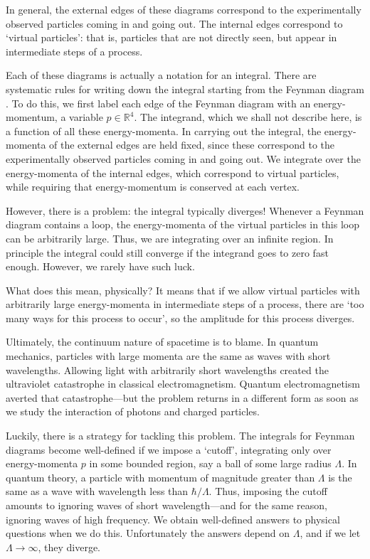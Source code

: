 \documentclass{article}
\newcommand{\R}{\mathbb{R}}
\begin{document}
In general, the external edges of these diagrams correspond to the experimentally observed particles coming in and going out.  The internal edges correspond to `virtual particles': that is, particles that are not directly seen, but appear in intermediate steps of a process.

Each of these diagrams is actually a notation for an integral. There are systematic rules for writing down the integral starting from the Feynman diagram \cite{IZ,PS}.  To do this, we first label each edge of the Feynman diagram with an energy-momentum, a variable $p \in \R^4$.   The integrand, which we shall not describe here, is a function of all these energy-momenta.  In carrying out the integral, the energy-momenta of the external edges are held fixed, since these correspond to the experimentally observed particles coming in and going out.  We integrate over the energy-momenta of the internal edges, which correspond to virtual particles, while requiring that energy-momentum is conserved at each vertex.  

However, there is a problem: the integral typically diverges!  Whenever a Feynman diagram contains a loop, the energy-momenta of the virtual particles in this loop can be arbitrarily large.  Thus, we are integrating over an infinite region.  In principle the integral could still converge if the integrand goes to zero fast enough.   However, we rarely have such luck.

What does this mean, physically?  It means that if we allow virtual particles with arbitrarily large energy-momenta in intermediate steps of a process, there are `too many ways for this process to occur', so the amplitude for this process diverges.  

Ultimately, the continuum nature of spacetime is to blame.  In quantum mechanics, particles with large momenta are the same as waves with short wavelengths.   Allowing light with arbitrarily short wavelengths created the ultraviolet catastrophe in classical electromagnetism.  Quantum electromagnetism averted that catastrophe---but the problem returns in a different form as soon as we study the interaction of photons and charged particles.

Luckily, there is a strategy for tackling this problem. The integrals for Feynman diagrams become well-defined if we impose a `cutoff', integrating only over energy-momenta $p$ in some bounded region, say a ball of some large radius $\Lambda$.   In quantum theory, a particle with momentum of magnitude greater than $\Lambda$ is the same as a wave with wavelength less than $\hbar/\Lambda$.    Thus, imposing the cutoff amounts to ignoring waves of short wavelength---and for the same reason, ignoring waves of high frequency.   We obtain well-defined answers to physical questions when we do this.  Unfortunately the answers depend on $\Lambda$, and if we let $\Lambda \to \infty$, they diverge.
\end{document}
